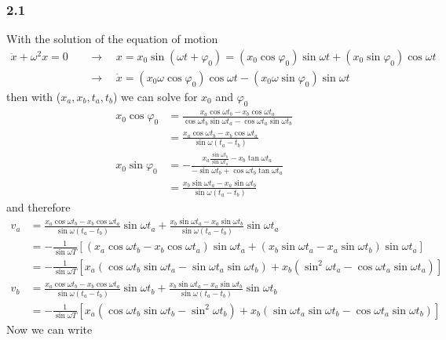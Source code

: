 \documentclass[10pt,a4paper]{book}
\theoremstyle{definition}
\begin{document}
\subsubsection{2.1}
With the solution of the equation of motion 
\begin{align}
    \ddot x+\omega^2x=0 &\quad\rightarrow\quad x=x_0\sin(\omega t+\varphi_0)=(x_0\cos\varphi_0)\sin \omega t+(x_0\sin\varphi_0)\cos\omega t\\
    &\quad\rightarrow\quad \dot x=(x_0\omega\cos\varphi_0)\cos \omega t-(x_0\omega\sin\varphi_0)\sin\omega t
\end{align}
then with ($x_a,x_b,t_a,t_b$) we can solve for $x_0$ and $\varphi_0$
\begin{align}
    x_0\cos\varphi_0
    &=\frac{x_a\cos\omega t_b-x_b\cos\omega t_a}{\cos\omega t_b\sin\omega t_a-\cos\omega t_a\sin\omega t_b}\\
    &=\frac{x_a\cos\omega t_b-x_b\cos\omega t_a}{\sin\omega(t_a-t_b)}\\
    x_0\sin\varphi_0&=-\frac{x_a\frac{\sin\omega t_b}{\sin\omega t_a}-x_b\tan\omega t_a}{-\sin\omega t_b+\cos\omega t_b\tan\omega t_a}\\
    &=\frac{x_b\sin\omega t_a-x_a\sin\omega t_b}{\sin\omega(t_a-t_b)}
\end{align}
and therefore
\begin{align}
    v_a&=\frac{x_a\cos\omega t_b-x_b\cos\omega t_a}{\sin\omega(t_a-t_b)}\sin\omega t_a+\frac{x_b\sin\omega t_a-x_a\sin\omega t_b}{\sin\omega(t_a-t_b)}\sin\omega t_a\\
    &=-\frac{1}{\sin\omega T}\left[(x_a\cos\omega t_b-x_b\cos\omega t_a)\sin\omega t_a+(x_b\sin\omega t_a-x_a\sin\omega t_b)\sin\omega t_a\right]\\
    &=-\frac{1}{\sin\omega T}\left[x_a(\cos\omega t_b\sin\omega t_a-\sin\omega t_a\sin\omega t_b)+x_b(\sin^2\omega t_a-\cos\omega t_a\sin\omega t_a)\right]\\
    v_b&=\frac{x_a\cos\omega t_b-x_b\cos\omega t_a}{\sin\omega(t_a-t_b)}\sin\omega t_b+\frac{x_b\sin\omega t_a-x_a\sin\omega t_b}{\sin\omega(t_a-t_b)}\sin\omega t_b\\
    &=-\frac{1}{\sin\omega T}\left[x_a(\cos\omega t_b\sin\omega t_b-\sin^2\omega t_b)+x_b(\sin\omega t_a\sin\omega t_b-\cos\omega t_a\sin\omega t_b)\right]
\end{align}
Now we can write
\end{document}
